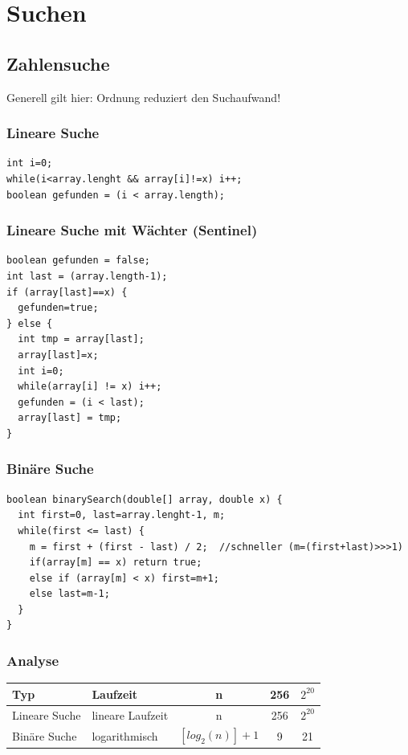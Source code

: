 \documentclass[a4paper,10pt]{article}
\begin{document}
\section{Suchen}

\subsection{Zahlensuche}
Generell gilt hier: Ordnung reduziert den Suchaufwand!

\subsubsection{Lineare Suche}
\begin{lstlisting}
int i=0;
while(i<array.lenght && array[i]!=x) i++;
boolean gefunden = (i < array.length);
\end{lstlisting}

\subsubsection{Lineare Suche mit W\"achter (Sentinel)}
\begin{lstlisting}
boolean gefunden = false;
int last = (array.length-1);
if (array[last]==x) {
  gefunden=true;
} else {
  int tmp = array[last];
  array[last]=x;
  int i=0;
  while(array[i] != x) i++;
  gefunden = (i < last);
  array[last] = tmp;
}
\end{lstlisting}

\subsubsection{Bin\"are Suche}
\begin{lstlisting}
boolean binarySearch(double[] array, double x) {
  int first=0, last=array.lenght-1, m;
  while(first <= last) {
    m = first + (first - last) / 2;  //schneller (m=(first+last)>>>1)
    if(array[m] == x) return true;
    else if (array[m] < x) first=m+1;
    else last=m-1;
  }
}
\end{lstlisting}

\subsubsection{Analyse}
\begin{tabular}{l | l | c | c | c }
	Typ & Laufzeit & n & 256 & $2^{20}$ \\
	\hline
	Lineare Suche & lineare Laufzeit & n & 256 & $2^{20}$ \\
	Bin\"are Suche & logarithmisch & $[log_{2}(n)]+1$ & 9 & 21
\end{tabular}
\end{document}
